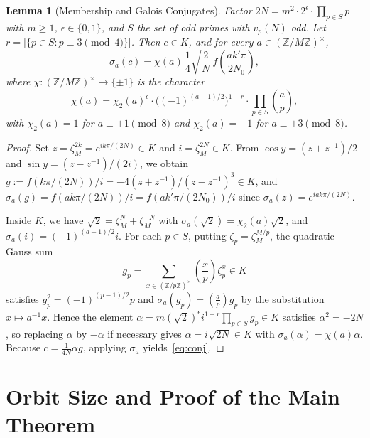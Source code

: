 \documentclass[11pt]{article}
\newtheorem{lemma}[theorem]{Lemma}
\begin{document}
\begin{lemma}[Membership and Galois Conjugates]\label{lem:galois}
Factor $2N = m^2 \cdot 2^\epsilon \cdot \prod_{p \in S} p$ with $m \ge 1$, $\epsilon \in \{0,1\}$, and $S$ the set of odd primes with $v_p(N)$ odd. Let $r = |\{p \in S : p \equiv 3 \pmod 4\}|$. Then $c \in K$, and for every $a \in (\mathbb{Z}/M\mathbb{Z})^\times$,
\begin{equation}\label{eq:conj}
\sigma_a(c) = \chi(a)\,\frac{1}{4}\sqrt{\frac{2}{N}}\,f\!\left(\frac{a k'\pi}{2N_0}\right),
\end{equation}
where $\chi : (\mathbb{Z}/M\mathbb{Z})^\times \to \{\pm 1\}$ is the character
\begin{equation}\label{eq:chi}
\chi(a) = \chi_2(a)^\epsilon \cdot \bigl((-1)^{(a-1)/2}\bigr)^{1-r} \cdot \prod_{p \in S} \left(\frac{a}{p}\right),
\end{equation}
with $\chi_2(a) = 1$ for $a \equiv \pm 1 \pmod 8$ and $\chi_2(a) = -1$ for $a \equiv \pm 3 \pmod 8$.
\end{lemma}

\begin{proof}
Set $z = \zeta_M^{2k} = e^{ik\pi/(2N)} \in K$ and $i = \zeta_M^{2N} \in K$. From $\cos y = (z+z^{-1})/2$ and $\sin y = (z-z^{-1})/(2i)$, we obtain $g := f(k\pi/(2N))/i = -4(z+z^{-1})/(z-z^{-1})^3 \in K$, and $\sigma_a(g) = f(ak\pi/(2N))/i = f(ak'\pi/(2N_0))/i$ since $\sigma_a(z) = e^{iak\pi/(2N)}$.

Inside $K$, we have $\sqrt{2} = \zeta_M^N + \zeta_M^{-N}$ with $\sigma_a(\sqrt{2}) = \chi_2(a)\sqrt{2}$, and $\sigma_a(i) = (-1)^{(a-1)/2} i$. For each $p \in S$, putting $\zeta_p = \zeta_M^{M/p}$, the quadratic Gauss sum
\[
g_p = \sum_{x \in (\mathbb{Z}/p\mathbb{Z})^\times} \left(\frac{x}{p}\right)\zeta_p^x \in K
\]
satisfies $g_p^2 = (-1)^{(p-1)/2} p$ and $\sigma_a(g_p) = \left(\frac{a}{p}\right) g_p$ by the substitution $x \mapsto a^{-1}x$. Hence the element $\alpha = m (\sqrt{2})^\epsilon i^{1-r} \prod_{p \in S} g_p \in K$ satisfies $\alpha^2 = -2N$, so replacing $\alpha$ by $-\alpha$ if necessary gives $\alpha = i\sqrt{2N} \in K$ with $\sigma_a(\alpha) = \chi(a)\alpha$. Because $c = \frac{1}{4N}\alpha g$, applying $\sigma_a$ yields~\eqref{eq:conj}.
\end{proof}

\section{Orbit Size and Proof of the Main Theorem}
\end{document}
